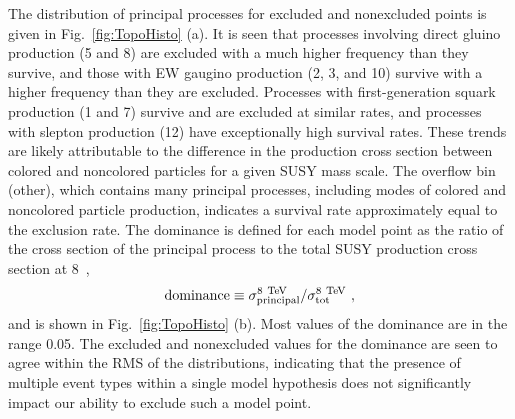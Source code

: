 The distribution of principal processes for excluded and nonexcluded
points is given in Fig.~\ref{fig:TopoHisto} (a).  It is seen that processes
involving direct gluino production (5 and 8) are excluded with
a much higher
frequency than they survive, and those with EW
gaugino production (2, 3, and 10) survive with a higher frequency than they are
excluded. Processes with first-generation squark production (1 and 7) survive
and are excluded at similar rates, and processes with
slepton production (12) have exceptionally high survival rates. 
These trends are likely attributable to the difference in the
production cross section between colored and noncolored particles for
a given SUSY mass scale. 
The overflow bin (other), which contains many principal
processes, including modes of colored and noncolored particle
production, indicates a survival rate approximately equal to the
exclusion rate.  
The dominance is defined for each model point
as the ratio of the cross section of the principal process to the total SUSY
production cross section at 8~\TeV, 
 \begin{equation}
  {\rm dominance} \equiv \sigma^{8~\text{TeV}~}_{\rm principal}/\sigma^{8~\text{TeV}~}_{\rm tot},
  \label{eq:dominance}
\end{equation}
and is shown in Fig.~\ref{fig:TopoHisto} (b). Most values of the dominance are in the
range 0.05. The excluded and nonexcluded values for the
dominance are seen to agree within the RMS of the distributions, indicating that the
presence of multiple event types within a single model
hypothesis does not
significantly impact our ability to exclude such a model point.
